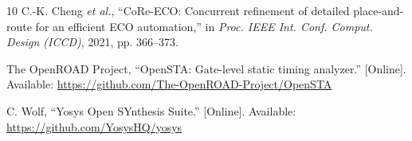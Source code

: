 \documentclass[journal]{IEEEtran}
\begin{document}
\begin{thebibliography}{10}
C.-K. Cheng \emph{et al.}, \textquotedblleft CoRe-ECO: Concurrent refinement of detailed place-and-route for an efficient ECO automation,\textquotedblright{} in \emph{Proc. IEEE Int. Conf. Comput. Design (ICCD)}, 2021, pp. 366--373.

The OpenROAD Project, \textquotedblleft OpenSTA: Gate-level static timing analyzer.\textquotedblright{} [Online]. Available: \url{https://github.com/The-OpenROAD-Project/OpenSTA}

C. Wolf, \textquotedblleft Yosys Open SYnthesis Suite.\textquotedblright{} [Online]. Available: \url{https://github.com/YosysHQ/yosys}

\end{thebibliography}
\end{document}
